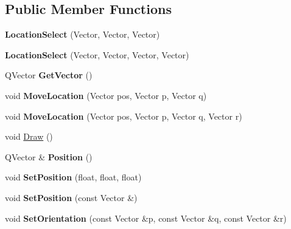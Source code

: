 \subsection*{Public Member Functions}
\begin{DoxyCompactItemize}
\item 
{\bfseries Location\+Select} (Vector, Vector, Vector)\hypertarget{classLocationSelect_ae8381e630decb0b880f2ee131168b3ad}{}\label{classLocationSelect_ae8381e630decb0b880f2ee131168b3ad}

\item 
{\bfseries Location\+Select} (Vector, Vector, Vector, Vector)\hypertarget{classLocationSelect_af0e55f80433ad384ada24f86f7cf85f1}{}\label{classLocationSelect_af0e55f80433ad384ada24f86f7cf85f1}

\item 
Q\+Vector {\bfseries Get\+Vector} ()\hypertarget{classLocationSelect_a383dda3911de469d69a1508eb4af5452}{}\label{classLocationSelect_a383dda3911de469d69a1508eb4af5452}

\item 
void {\bfseries Move\+Location} (Vector pos, Vector p, Vector q)\hypertarget{classLocationSelect_acfc396e8ac2457605f78b4e101d5ef12}{}\label{classLocationSelect_acfc396e8ac2457605f78b4e101d5ef12}

\item 
void {\bfseries Move\+Location} (Vector pos, Vector p, Vector q, Vector r)\hypertarget{classLocationSelect_ada190e107d11d97775476c5625ffef51}{}\label{classLocationSelect_ada190e107d11d97775476c5625ffef51}

\item 
void \hyperlink{classLocationSelect_a822ae1784320aebe5461a0358964fe12}{Draw} ()
\item 
Q\+Vector \& {\bfseries Position} ()\hypertarget{classLocationSelect_a6073d7f9eacea50ec97e1a0e41ce0349}{}\label{classLocationSelect_a6073d7f9eacea50ec97e1a0e41ce0349}

\item 
void {\bfseries Set\+Position} (float, float, float)\hypertarget{classLocationSelect_a0f85622a6f4866f000903a9cc217a796}{}\label{classLocationSelect_a0f85622a6f4866f000903a9cc217a796}

\item 
void {\bfseries Set\+Position} (const Vector \&)\hypertarget{classLocationSelect_a1b6078be541a2dc6f2240c31a2bef02e}{}\label{classLocationSelect_a1b6078be541a2dc6f2240c31a2bef02e}

\item 
void {\bfseries Set\+Orientation} (const Vector \&p, const Vector \&q, const Vector \&r)\hypertarget{classLocationSelect_a1d2342f3a079201ca9dd7a981ea36b6e}{}\label{classLocationSelect_a1d2342f3a079201ca9dd7a981ea36b6e}

\end{DoxyCompactItemize}
